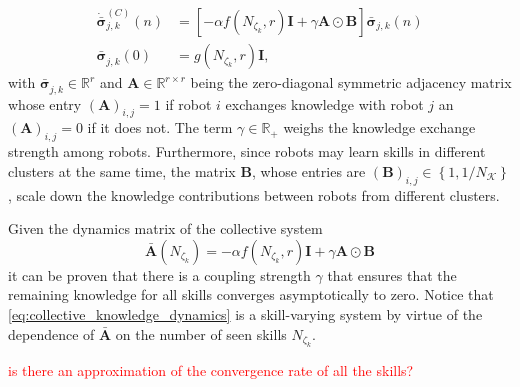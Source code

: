 \begin{subequations}\label{eq:collective_knowledge_dynamics}
	\begin{alignat}{2}
		\dot{\bar{\bm{\sigma}}}^{(C)}_{j,k}\left(n\right) &= \left[-\alpha  f\left(N_{\zeta_k},r\right) \bm{I} + \gamma \bm{A} \odot \bm{B}  \right] \bar{\bm{\sigma}}_{j,k}\left(n\right)\\
		\bar{\bm{\sigma}}^{}_{j,k}(0) &= g\left( N_{\zeta_k}, r\right) \bm{I},
	\end{alignat}
\end{subequations}
with $\bar{\bm{\sigma}}^{}_{j,k} \in \mathbb{R}^r$ and $\bm{A} \in \mathbb{R}^{r \times r}$ being the zero-diagonal symmetric adjacency matrix whose entry $(\bm{A})_{i,j} = 1$ if robot $i$ exchanges knowledge with robot $j$ an $(\bm{A})_{i,j} = 0$ if it does not. The term $\gamma \in \mathbb{R}_+ $ weighs the knowledge exchange strength among robots. Furthermore, since robots may learn skills in different clusters at the same time, the matrix $\bm{B}$, whose entries are $\left(\bm{B}\right)_{i,j} \in \left \lbrace 1, 1/N_\mathcal{K} \right \rbrace$, scale down the knowledge contributions between robots from different clusters.

Given the dynamics matrix of the collective system
\begin{equation}
	\bar{\bm{A}}\left(N_{\zeta_k}\right) =-\alpha  f\left(N_{\zeta_k},r\right) \bm{I} + \gamma \bm{A} \odot \bm{B} 
\end{equation} 
it can be proven that there is a coupling strength $\gamma$ that ensures that the remaining knowledge for all skills converges asymptotically to zero. Notice that \eqref{eq:collective_knowledge_dynamics} is a skill-varying system by virtue of the dependence of $\bar{\bm{A}}$ on the number of seen skills $N_{\zeta_k}$.

\TODO \textcolor{red}{is there an approximation of the convergence rate of all the skills?}





